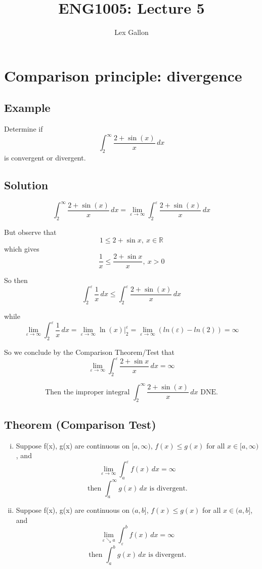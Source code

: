 \documentclass[11pt]{article}
\newcommand{\reals}{\mathbb{R}}
\begin{document}
\title{ENG1005: Lecture 5}
\author{Lex Gallon}
\maketitle

\tableofcontents

\section{Comparison principle: divergence}
\subsection*{Example}
Determine if
\[ \int_2^\infty \frac{2+\sin(x)}{x} \, dx \]
is convergent or divergent.

\subsection*{Solution}
\[ \int_2^\infty \frac{2+\sin(x)}{x} \, dx = \lim_{\varepsilon\rightarrow\infty} \int_2^\varepsilon\frac{2+\sin(x)}{x} \, dx \]

But observe that
\[ 1 \leq 2 + \sin x,\ x \in \reals \]
which gives
\[ \frac{1}{x} \leq \frac{2 + \sin x}{x},\ x >0 \]

So then
\[ \int_2^\varepsilon\frac{1}{x} \, dx \leq \int_2^\varepsilon\frac{2+\sin(x)}{x} \, dx \]

while
\[
\lim_{\varepsilon\rightarrow\infty} \int_2^\varepsilon\frac{1}{x} \, dx = \lim_{\varepsilon\rightarrow\infty} \left. \ln(x)\right|_2^\varepsilon = \lim_{\varepsilon\rightarrow\infty} \left( ln(\varepsilon) - ln(2) \right) = \infty
\]

So we conclude by the Comparison Theorem/Test that 
\[ \lim_{\varepsilon\rightarrow\infty} \int_2^\varepsilon \frac{2+\sin x}{x} \,dx = \infty \]

\[ \text{Then the improper integral } \int_2^\infty \frac{2+\sin(x)}{x} \, dx \text{ DNE.} \]

\subsection*{Theorem (Comparison Test)}
\begin{enumerate}[(i)]
\item Suppose f(x), g(x) are continuous on $[a, \infty)$, $f(x) \leq g(x)$ for all $x \in [a, \infty)$, and
\[ \lim_{\varepsilon\rightarrow\infty} \int_a^\varepsilon f(x) \,dx = \infty \]
\[ \text{then } \int_a^\infty g(x) \,dx \text{ is divergent.} \]

\item Suppose f(x), g(x) are continuous on $(a, b]$, $f(x) \leq g(x)$ for all $x \in (a, b]$, and
\[ \lim_{\varepsilon\searrow a} \int_\varepsilon^b f(x) \,dx = \infty \]
\[ \text{then } \int_a^b g(x) \,dx \text{ is divergent.} \]
\end{enumerate}
\end{document}
